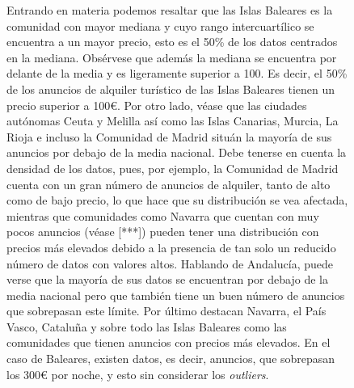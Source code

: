 \documentclass[a4paper,10pt]{article}
\begin{document}
\begin{figure}[ht]
                \noindent
                Entrando en materia podemos resaltar que las Islas Baleares es la comunidad con mayor mediana y cuyo rango intercuartílico se encuentra a un mayor precio, esto es el 50\% de los datos centrados en la mediana. Obsérvese que además la mediana se encuentra por delante de la media y es ligeramente superior a 100. Es decir, el 50\% de los anuncios de alquiler turístico de las Islas Baleares tienen un precio superior a 100€. Por otro lado, véase que las ciudades autónomas Ceuta y Melilla así como las Islas Canarias, Murcia, La Rioja e incluso la Comunidad de Madrid situán la mayoría de sus anuncios por debajo de la media nacional. Debe tenerse en cuenta la densidad de los datos, pues, por ejemplo, la Comunidad de Madrid cuenta con un gran número de anuncios de alquiler, tanto de alto como de bajo precio, lo que hace que su distribución se vea afectada, mientras que comunidades como Navarra que cuentan con muy pocos anuncios (véase [***]) pueden tener una distribución con precios más elevados debido a la presencia de tan solo un reducido número de datos con valores altos.
                Hablando de Andalucía, puede verse que la mayoría de sus datos se encuentran por debajo de la media nacional pero que también tiene un buen
                número de anuncios que sobrepasan este límite. 
                Por último destacan Navarra, el País Vasco, Cataluña y sobre todo las Islas Baleares como las comunidades que tienen anuncios con precios más elevados. En el caso de Baleares, existen datos, es decir, anuncios, que sobrepasan los 300€ por noche, y esto sin considerar los \textit{outliers}.



            \end{figure}

            \clearpage
\end{document}
